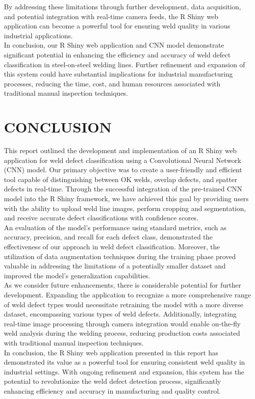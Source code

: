 \documentclass{article_saj}
\begin{document}
\indent By addressing these limitations through further development, data acquisition, and potential integration with real-time camera feeds, the R Shiny web application can become a powerful tool for ensuring weld quality in various industrial applications.\\ 

\indent In conclusion, our R Shiny web application and CNN model demonstrate significant potential in enhancing the efficiency and accuracy of weld defect classification in steel-on-steel welding lines. Further refinement and expansion of this system could have substantial implications for industrial manufacturing processes, reducing the time, cost, and human resources associated with traditional manual inspection techniques.

\section{CONCLUSION}
\indent This report outlined the development and implementation of an R Shiny web application for weld defect classification using a Convolutional Neural Network (CNN) model. Our primary objective was to create a user-friendly and efficient tool capable of distinguishing between OK welds, overlap defects, and spatter defects in real-time. Through the successful integration of the pre-trained CNN model into the R Shiny framework, we have achieved this goal by providing users with the ability to upload weld line images, perform cropping and segmentation, and receive accurate defect classifications with confidence scores.\\

\indent An evaluation of the model's performance using standard metrics, such as accuracy, precision, and recall for each defect class, demonstrated the effectiveness of our approach in weld defect classification. Moreover, the utilization of data augmentation techniques during the training phase proved valuable in addressing the limitations of a potentially smaller dataset and improved the model's generalization capabilities.\\

\indent As we consider future enhancements, there is considerable potential for further development. Expanding the application to 
recognize a more comprehensive range of weld defect types would necessitate retraining the model with a more diverse dataset, encompassing various types of weld defects. Additionally, integrating real-time image processing through camera integration would enable on-the-fly weld analysis during the welding process, reducing production costs associated with traditional manual inspection techniques.\\
\indent In conclusion, the R Shiny web application presented in this report has demonstrated its value as a powerful tool for ensuring consistent weld quality in industrial settings. With ongoing refinement and expansion, this system has the potential to revolutionize the weld defect detection process, significantly enhancing efficiency and accuracy in manufacturing and quality control.
\end{document}
